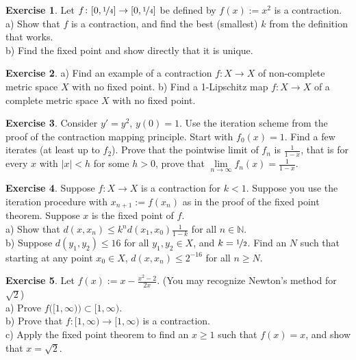 \documentclass[12pt]{book}
\newcommand{\abs}[1]{\left\lvert {#1} \right\rvert}
\newcommand{\N}{{\mathbb{N}}}
\theoremstyle{plain}
\theoremstyle{remark}
\theoremstyle{definition}
\theoremstyle{exercise}
\newtheorem{exercise}{Exercise}[section]
\theoremstyle{example}
\begin{document}
\begin{exercise}
Let $f \colon [0,\nicefrac{1}{4}] \to [0,\nicefrac{1}{4}]$ be defined by
$f(x) := x^2$ is a contraction.\\
a) Show that $f$
is a contraction, and find the best (smallest) $k$ from the definition that works.\\
b) Find the fixed point and show directly that it is unique.
\end{exercise}

\begin{exercise} \label{exercise:nofixedpoint}
a) Find an example of a contraction $f \colon X \to X$
of non-complete metric space $X$ with no
fixed point.
b) Find a 1-Lipschitz map $f \colon X \to X$ of a complete metric space $X$ with no fixed point.
\end{exercise}

\begin{exercise}
Consider $y' =y^2$, $y(0)=1$.  Use the iteration scheme
from the proof of the contraction mapping principle.
Start with $f_0(x) = 1$.  Find a 
few iterates (at least up to $f_2$).  Prove that
the pointwise limit of $f_n$ is $\frac{1}{1-x}$, that is for every $x$
with $\abs{x} < h$ for some $h > 0$,
prove that $\lim\limits_{n\to\infty}f_n(x) = \frac{1}{1-x}$.
\end{exercise}

\begin{exercise}
Suppose $f \colon X \to X$ is a contraction for $k < 1$.  Suppose you use the iteration
procedure with $x_{n+1} := f(x_n)$ as in the proof of the fixed point theorem.
Suppose $x$ is the fixed
point of $f$.\\
a) Show that $d(x,x_n) \leq k^n d(x_1,x_0) \frac{1}{1-k}$ for all $n \in \N$.\\
b) Suppose $d(y_1,y_2) \leq 16$ for all $y_1,y_2 \in X$, and $k=
\nicefrac{1}{2}$.  Find an $N$ such that starting at any point $x_0 \in X$, 
$d(x,x_n) \leq 2^{-16}$ for all $n \geq N$.
\end{exercise}

\begin{exercise}
Let $f(x) := x-\frac{x^2-2}{2x}$. (You may recognize Newton's method for
$\sqrt{2}$)\\
a) Prove $f\bigl([1,\infty)\bigr) \subset [1,\infty)$.\\
b) Prove that $f \colon [1,\infty) \to [1,\infty)$ is a contraction.\\
c) Apply the fixed point theorem to find an $x \geq 1$ such that
$f(x) = x$, and show that $x = \sqrt{2}$.
\end{exercise}
\end{document}
